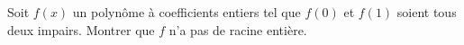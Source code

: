 Soit $f(x)$ un polynôme à coefficients entiers tel que $f(0)$ et $f(1)$ soient tous deux impairs. Montrer que $f$ n'a pas de racine entière.
